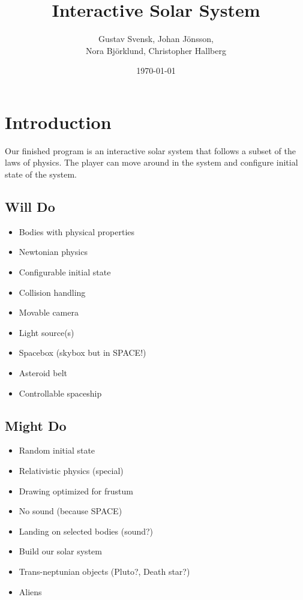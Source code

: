 \documentclass[a4paper,12pt]{article} \usepackage{graphicx}
\title{Interactive Solar System}
\author{Gustav Svensk, Johan Jönsson, \\
    Nora Björklund, Christopher Hallberg}
\date{\today}
\begin{document}
\maketitle
{}
\tableofcontents
\newpage
\section{Introduction}
Our finished program is an interactive solar system that follows a subset of 
the laws of physics. The player can move around in the system and configure
initial state of the system.

\subsection{Will Do}
\begin{itemize}
        \item Bodies with physical properties
        \item Newtonian physics
        \item Configurable initial state
        \item Collision handling
        \item Movable camera
        \item Light source(s)
        \item Spacebox (skybox but in SPACE!)
        \item Asteroid belt
        \item Controllable spaceship
\end{itemize}

\subsection{Might Do}
\begin{itemize}
        \item Random initial state
        \item Relativistic physics (special)
        \item Drawing optimized for frustum
        \item No sound (because SPACE)
        \item Landing on selected bodies (sound?)
        \item Build our solar system
        \item Trans-neptunian objects (Pluto?, Death star?)
        \item Aliens
\end{itemize}
\end{document}
